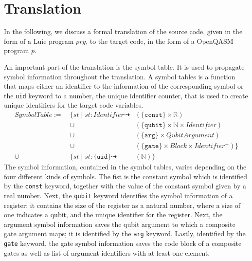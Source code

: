 \section{Translation}
\label{sec:concept_translation}
In the following, we discuss a formal translation of the source code, given in the form of a Luie program $prg$, to the target code, in the form of a OpenQASM program $p$. 

An important part of the translation is the symbol table. It is used to propagate symbol information throughout the translation. A symbol tables is a function that maps either an identifier to the information of the corresponding symbol or the \texttt{uid} keyword to a number, the unique identifier counter, that is used to create unique identifiers for the target code variables.
\begin{align*}
    SymbolTable := \ & \{st \mid st : Identifier \dashrightarrow & (\{\texttt{const}\} \times \mathbb{R})\\
    & \cup& (\{\texttt{qubit}\} \times \mathbb{N} \times Identifier)\\
    & \cup& (\{\texttt{arg}\} \times QubitArgument)\\
    & \cup& (\{\texttt{gate}\} \times Block \times Identifier^+)
    \} \\
   \cup \ & \{st \mid st : \{\texttt{uid}\} \dashrightarrow & (\mathbb{N})\}
\end{align*}
The symbol information, contained in the symbol tables, varies depending on the four different kinds of symbols. The fist is the constant symbol which is identified by the \texttt{const} keyword, together with the value of the constant symbol given by a real number. Next, the \texttt{qubit} keyword identifies the symbol information of a register; it contains the size of the register as a natural number, where a size of one indicates a qubit, and the unique identifier for the register. Next, the argument symbol information saves the qubit argument to which a composite gate argument maps; it is identified by the \texttt{arg} keyword. Lastly, identified by the \texttt{gate} keyword, the gate symbol information saves the code block of a composite gates as well as list of argument identifiers with at least one element. 

